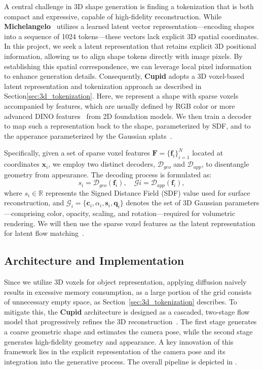 \documentclass[../../book-main.tex]{subfiles}
\begin{document}
A central challenge in 3D shape generation is finding a tokenization
that is both compact and expressive, capable of high-fidelity
reconstruction. While
\textbf{Michelangelo}~\citep{zhao2023michelangelo} utilizes a learned
latent vector representation—encoding shapes into a sequence of 1024
tokens—these vectors lack explicit 3D spatial coordinates. In this
project, we seek a latent representation that retains explicit 3D
positional information, allowing us to align shape tokens directly
with image pixels. By establishing this spatial correspondence, we
can leverage local pixel information to enhance generation details.
Consequently, \textbf{Cupid} adopts a 3D voxel-based latent
representation and tokenization approach as described in
Section\ref{sec:3d_tokenization}. Here, we represent a shape with
sparse voxels accompanied by features, which are usually defined by
RGB color or more advanced DINO features~\citep{DINOv2} from 2D
foundation models. We then train a decoder to map such a
representation back to the shape, parameterized by SDF, and to the
apperance parameterized by the Gaussian splats~\citep{kerbl20233d}.

Specifically, given a set of sparse voxel features $\boldsymbol{F} =
\{\boldsymbol{f}_i\}_{i=1}^N$ located at coordinates
$\boldsymbol{x}_i$, we employ two distinct decoders,
$\mathcal{D}_{geo}$ and $\mathcal{D}_{app}$, to disentangle geometry
from appearance. The decoding process is formulated as:
\begin{equation}
s_i = \mathcal{D}_{geo}(\boldsymbol{f}_i), \quad \mathcal{G}i =
\mathcal{D}_{app}(\boldsymbol{f}_i),
\end{equation}
where $s_i \in \mathbb{R}$ represents the Signed Distance Field (SDF)
value used for surface reconstruction, and $\mathcal{G}_i =
\{\boldsymbol{c}_i, \alpha_i, \boldsymbol{s}_i, \boldsymbol{q}_i\}$
denotes the set of 3D Gaussian parameters—comprising color, opacity,
scaling, and rotation—required for volumetric rendering. We will then
use the sparse voxel features as the latent representation for latent
flow matching~\citep{rombach2022high}.

\subsection{Architecture and Implementation}
\label{sub:3d_reconstruction_architecture}
Since we utilize 3D voxels for object representation, applying
diffusion naively results in excessive memory consumption, as a large
portion of the grid consists of unnecessary empty space, as
Section~\ref{sec:3d_tokenization} describes. To mitigate this, the
\textbf{Cupid} architecture is designed as a cascaded, two-stage flow
model that progressively refines the 3D
reconstruction~\citep{xiang2025structured}. The first stage generates
a coarse geometric shape and estimates the camera pose, while the
second stage generates high-fidelity geometry and appearance. A key
innovation of this framework lies in the explicit representation of
the camera pose and its integration into the generative process. The
overall pipeline is depicted in .
\end{document}
